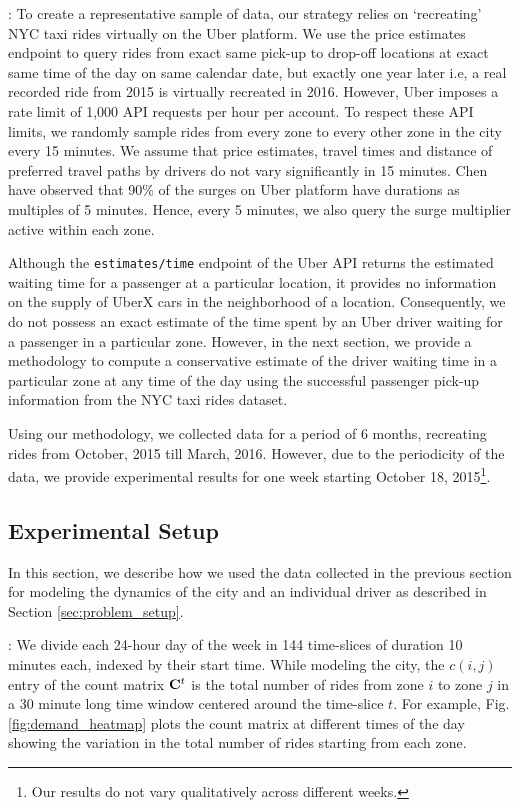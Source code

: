 :
To create a representative sample of data, our strategy relies on `recreating' NYC taxi rides virtually on the Uber platform. We use the price estimates endpoint to query rides from exact same pick-up to drop-off locations at exact same time of the day on same calendar date, but exactly one year later i.e, a real recorded ride from 2015 is virtually recreated in 2016. However, Uber imposes a rate limit of 1,000 API requests per hour per account. To respect these API limits, we randomly sample rides from every zone to every other zone in the city every 15 minutes. We assume that price estimates, travel times and distance of preferred travel paths by drivers do not vary significantly in 15 minutes. Chen {\etal}~\cite{chen2015peeking} have observed that 90\% of the surges on Uber platform have durations as multiples of 5 minutes. Hence, every 5 minutes, we also query the surge multiplier active within each zone.

Although the \texttt{estimates/time} endpoint of the Uber API returns the estimated waiting time for a passenger at a particular location, it provides no information on the supply of UberX cars in the neighborhood of a location. Consequently, we do not possess an exact estimate of the time spent by an Uber driver waiting for a passenger in a particular zone. However, in the next section, we provide a methodology to compute a conservative estimate of the driver waiting time in a particular zone at any time of the day using the successful passenger pick-up information from the NYC taxi rides dataset.

Using our methodology, we collected data for a period of 6 months, recreating rides from October, 2015 till March, 2016. However, due to the periodicity of the data, we provide experimental results for one week starting October 18, 2015\footnote{Our results do not vary qualitatively across different weeks.}.

\subsection{Experimental Setup}
In this section, we describe how we used the data collected in the previous section for modeling the dynamics of the city and an individual driver as described in Section \ref{sec:problem_setup}.


:
We divide each 24-hour day of the week in 144 time-slices of duration 10 minutes each, indexed by their start time. While modeling the city, the $c(i,j)$ entry of the count matrix ${\mathbf{C}}^t$ is the total number of rides from zone $i$ to zone $j$ in a 30 minute long time window centered around the time-slice $t$.  For example, Fig. \ref{fig:demand_heatmap} plots the count matrix {\countmatrix} at different times of the day showing the variation in the total number of rides starting from each zone.

